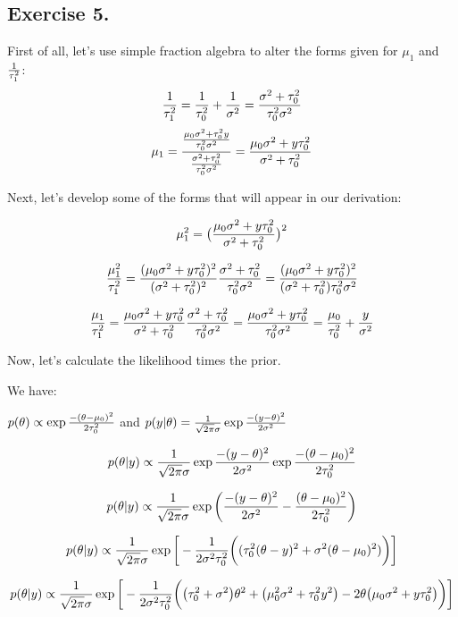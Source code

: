 \documentclass{article}
\begin{document}
\subsection{Exercise 5.}

First of all, let's use simple fraction algebra to alter the forms given for \(\mu_1\) and \(1 \over \tau_1^2\):
\[{1 \over \tau_1^2} = {1 \over \tau_0^2} + {1 \over \sigma^2} = {\sigma^2 + \tau_0^2 \over \tau_0^2 \sigma^2}\]
\[\mu_1 = {{\mu_0 \sigma^2 + \tau_0^2 y  \over \tau_0^2 \sigma^2} \over  {\sigma^2 + \tau_0^2 \over \tau_0^2 \sigma^2}  } = {\mu_0 \sigma^2 + y \tau_0^2 \over \sigma^2 + \tau_0^2} \] 

Next, let's develop some of the forms that will appear in our derivation:

\[\mu_1^2 = \big({\mu_0 \sigma^2 + y \tau_0^2 \over \sigma^2 + \tau_0^2}\big)^2 \] 

\[{\mu_1^2 \over \tau_1^2} 
= {(\mu_0 \sigma^2 + y \tau_0^2)^2 \over (\sigma^2 + \tau_0^2)^2} {\sigma^2 + \tau_0^2 \over \tau_0^2 \sigma^2}
=  {(\mu_0 \sigma^2 + y \tau_0^2)^2 \over (\sigma^2 + \tau_0^2) \tau_0^2 \sigma^2}\]



\[  { \mu_1 \over \tau_1^2 }
=  {\mu_0 \sigma^2 + y \tau_0^2 \over \sigma^2 + \tau_0^2} {\sigma^2 + \tau_0^2 \over \tau_0^2 \sigma^2}
 = {\mu_0 \sigma^2 + y \tau_0^2 \over \tau_0^2 \sigma^2}
= {\mu_0 \over \tau_0^2} + {y \over \sigma^2}\] 


Now, let's calculate the likelihood times the prior.

We have: 

\(p(\theta) \propto \exp{-(\theta - \mu_0)^2 \over 2 \tau_0^2}\)
and \(p(y \vert \theta) = {1 \over \sqrt{2\pi}\sigma}\exp{-(y - \theta)^2 \over 2\sigma^2}\)

 \[p(\theta \vert y) \propto  {1 \over \sqrt{2\pi}\sigma}
\exp{ -(y - \theta)^2 \over 2\sigma^2}\exp{-(\theta - \mu_0)^2 \over 2 \tau_0^2}\]

 \[p(\theta \vert y) \propto  {1 \over \sqrt{2\pi}\sigma}
\exp{ \bigg( {-(y - \theta)^2 \over 2\sigma^2} - {(\theta - \mu_0)^2 \over 2 \tau_0^2} \bigg)}\]

 \[p(\theta \vert y) \propto  {1 \over \sqrt{2\pi}\sigma}
\exp{ \bigg[ -{1 \over 2 \sigma^2 \tau_0^2}\bigg(({\tau_0^2(\theta -  y)^2 + \sigma^2(\theta - \mu_0)^2}) \bigg)\bigg]}\]

 \[p(\theta \vert y) \propto  {1 \over \sqrt{2\pi}\sigma}
\exp{\bigg[-{1 \over 2 \sigma^2 \tau_0^2} \bigg( 
\big( \tau_0^2 + \sigma^2\big)\theta^2 + 
\big(\mu_0^2\sigma^2 + \tau_0^2y^2\big) 
- 2\theta\big(\mu_0\sigma^2 + y\tau_0^2\big)
\bigg)\bigg]}\]
\end{document}
